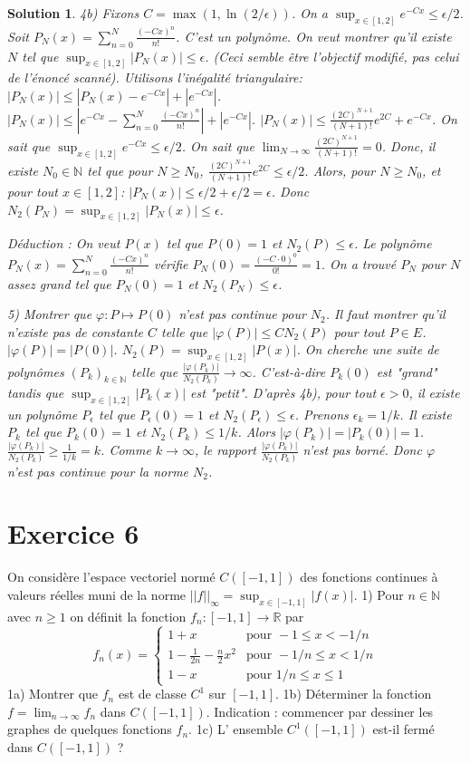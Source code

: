 \documentclass{article}
\newtheorem{solution}{Solution}
\begin{document}
\begin{solution}
4b) Fixons $C = \max(1, \ln(2/\epsilon))$. On a $\sup_{x \in [1,2]} e^{-Cx} \le \epsilon/2$.
Soit $P_N(x) = \sum_{n=0}^N \frac{(-Cx)^n}{n!}$. C'est un polynôme.
On veut montrer qu'il existe $N$ tel que $\sup_{x \in [1,2]} |P_N(x)| \le \epsilon$. (Ceci semble être l'objectif modifié, pas celui de l'énoncé scanné).
Utilisons l'inégalité triangulaire: $|P_N(x)| \le |P_N(x) - e^{-Cx}| + |e^{-Cx}|$.
$|P_N(x)| \le |e^{-Cx} - \sum_{n=0}^N \frac{(-Cx)^n}{n!}| + |e^{-Cx}|$.
$|P_N(x)| \le \frac{(2C)^{N+1}}{(N+1)!} e^{2C} + e^{-Cx}$.
On sait que $\sup_{x \in [1,2]} e^{-Cx} \le \epsilon/2$.
On sait que $\lim_{N \to \infty} \frac{(2C)^{N+1}}{(N+1)!} = 0$.
Donc, il existe $N_0 \in \mathbb{N}$ tel que pour $N \ge N_0$, $\frac{(2C)^{N+1}}{(N+1)!} e^{2C} \le \epsilon/2$.
Alors, pour $N \ge N_0$, et pour tout $x \in [1,2]$:
$|P_N(x)| \le \epsilon/2 + \epsilon/2 = \epsilon$.
Donc $N_2(P_N) = \sup_{x \in [1,2]} |P_N(x)| \le \epsilon$.

Déduction : On veut $P(x)$ tel que $P(0)=1$ et $N_2(P) \le \epsilon$.
Le polynôme $P_N(x) = \sum_{n=0}^N \frac{(-Cx)^n}{n!}$ vérifie $P_N(0) = \frac{(-C \cdot 0)^0}{0!} = 1$.
On a trouvé $P_N$ pour $N$ assez grand tel que $P_N(0)=1$ et $N_2(P_N) \le \epsilon$.

5) Montrer que $\varphi: P \mapsto P(0)$ n'est pas continue pour $N_2$.
Il faut montrer qu'il n'existe pas de constante $C$ telle que $|\varphi(P)| \le C N_2(P)$ pour tout $P \in E$.
$|\varphi(P)| = |P(0)|$. $N_2(P) = \sup_{x \in [1,2]} |P(x)|$.
On cherche une suite de polynômes $(P_k)_{k \in \mathbb{N}}$ telle que $\frac{|\varphi(P_k)|}{N_2(P_k)} \to \infty$.
C'est-à-dire $P_k(0)$ est "grand" tandis que $\sup_{x \in [1,2]} |P_k(x)|$ est "petit".
D'après 4b), pour tout $\epsilon > 0$, il existe un polynôme $P_\epsilon$ tel que $P_\epsilon(0)=1$ et $N_2(P_\epsilon) \le \epsilon$.
Prenons $\epsilon_k = 1/k$. Il existe $P_k$ tel que $P_k(0)=1$ et $N_2(P_k) \le 1/k$.
Alors $|\varphi(P_k)| = |P_k(0)| = 1$.
$\frac{|\varphi(P_k)|}{N_2(P_k)} \ge \frac{1}{1/k} = k$.
Comme $k \to \infty$, le rapport $\frac{|\varphi(P_k)|}{N_2(P_k)}$ n'est pas borné.
Donc $\varphi$ n'est pas continue pour la norme $N_2$.
\end{solution}

\section*{Exercice 6}
On considère l'espace vectoriel normé $C([-1,1])$ des fonctions continues à valeurs réelles muni de la norme $||f||_{\infty} = \sup_{x \in [-1,1]} |f(x)|$.
1) Pour $n \in \mathbb{N}$ avec $n \ge 1$ on définit la fonction $f_n : [-1, 1] \to \mathbb{R}$ par
\[ f_n(x) = \begin{cases} 1+x & \text{pour } -1 \le x < -1/n \\ 1 - \frac{1}{2n} - \frac{n}{2} x^2 & \text{pour } -1/n \le x < 1/n \\ 1-x & \text{pour } 1/n \le x \le 1 \end{cases} \]
1a) Montrer que $f_n$ est de classe $C^1$ sur $[-1, 1]$.
1b) Déterminer la fonction $f = \lim_{n \to \infty} f_n$ dans $C([-1,1])$. Indication : commencer par dessiner les graphes de quelques fonctions $f_n$.
1c) L' ensemble $C^1([-1, 1])$ est-il fermé dans $C([-1,1])$ ?
\end{document}
